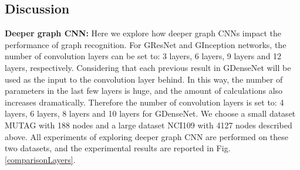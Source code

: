 \documentclass[journal]{IEEEtran}
\begin{document}
\subsection{Discussion}
\textbf{Deeper graph CNN:}
Here we explore how deeper graph CNNs impact the performance of graph recognition.
For G\underline{\hspace{0.5em}}ResNet and G\underline{\hspace{0.5em}}Inception networks, the number of convolution layers can be set to: 3 layers, 6 layers, 9 layers and 12 layers, respectively.
Considering that each previous result in G\underline{\hspace{0.5em}}DenseNet will be used as the input to the convolution layer behind. In this way, the number of parameters in the last few layers is huge, and the amount of calculations also increases dramatically. Therefore the number of convolution layers is set to: 4 layers, 6 layers, 8 layers and 10 layers for G\underline{\hspace{0.5em}}DenseNet.
We choose a small dataset MUTAG with 188 nodes and a large dataset NCI109 with 4127 nodes described above. All experiments of exploring deeper graph CNN are performed on these two datasets, and the experimental results are reported in Fig. \ref{comparisonLayers}.
\end{document}
